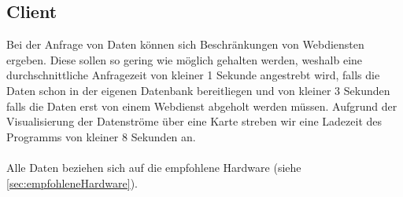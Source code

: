 \subsection{Client}
Bei der Anfrage von Daten können sich Beschränkungen von Webdiensten ergeben. Diese sollen so gering wie möglich gehalten werden, weshalb eine durchschnittliche Anfragezeit von kleiner 1 Sekunde angestrebt wird, falls die Daten schon in der eigenen Datenbank bereitliegen und von kleiner 3 Sekunden falls die Daten erst von einem Webdienst abgeholt werden müssen.
Aufgrund der Visualisierung der Datenströme über eine Karte streben wir eine Ladezeit des Programms von kleiner 8 Sekunden an.\\\\
Alle Daten beziehen sich auf die empfohlene Hardware (siehe \ref{sec:empfohleneHardware}).